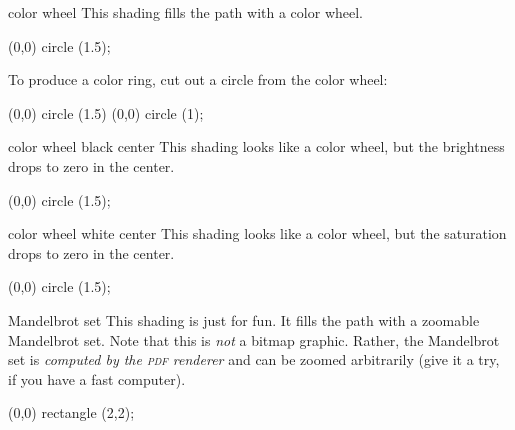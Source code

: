 \begin{shading}{color wheel}
\label{shading-color-wheel}%
    This shading fills the path with a color wheel.
\begin{codeexample}[preamble={\usepgflibrary{shadings}}]
\tikz \shade[shading=color wheel] (0,0) circle (1.5);
\end{codeexample}
    To produce a color ring, cut out a circle from the color wheel:
\begin{codeexample}[preamble={\usepgflibrary{shadings}}]
\tikz {}
  (0,0) circle (1.5)
  (0,0) circle (1);
\end{codeexample}
\end{shading}

\begin{shading}{color wheel black center}
    This shading looks like a color wheel, but the brightness drops to zero in
    the center.
\begin{codeexample}[preamble={\usepgflibrary{shadings}}]
\tikz \shade[shading=color wheel black center] (0,0) circle (1.5);
\end{codeexample}
\end{shading}

\begin{shading}{color wheel white center}
    This shading looks like a color wheel, but the saturation drops to zero in
    the center.
\begin{codeexample}[preamble={\usepgflibrary{shadings}}]
\tikz \shade[shading=color wheel white center] (0,0) circle (1.5);
\end{codeexample}
\end{shading}

\makeatletter
\begin{shading}{Mandelbrot set}
    This shading is just for fun. It fills the path with a zoomable Mandelbrot
    set. Note that this is \emph{not} a bitmap graphic. Rather, the Mandelbrot
    set is \emph{computed by the \textsc{pdf} renderer} and can be zoomed
    arbitrarily (give it a try, if you have a fast computer).
\begin{codeexample}[preamble={\usepgflibrary{shadings}}]
\tikz \shade[shading=Mandelbrot set] (0,0) rectangle (2,2);
\end{codeexample}
\end{shading}
\makeatother

